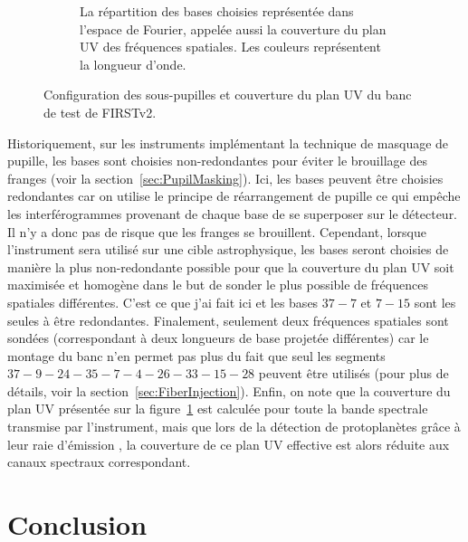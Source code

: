 \begin{figure}[ht!]
\begin{subfigure}{0.6\textwidth}
        \caption{La répartition des bases choisies représentée dans l'espace de Fourier, appelée aussi la couverture du plan UV des fréquences spatiales. Les couleurs représentent la longueur d'onde.}
        \label{fig:SegUVSimuleB}
    \end{subfigure}
    \caption[Configuration des sous-pupilles et couverture du plan UV du banc de test de FIRSTv2.]{Configuration des sous-pupilles et couverture du plan UV du banc de test de FIRSTv2.}
    \label{fig:SegUVSimule}
\end{figure}

Historiquement, sur les instruments implémentant la technique de masquage de pupille, les bases sont choisies non-redondantes pour éviter le brouillage des franges (voir la section~\ref{sec:PupilMasking}). Ici, les bases peuvent être choisies redondantes car on utilise le principe de réarrangement de pupille ce qui empêche les interférogrammes provenant de chaque base de se superposer sur le détecteur. Il n'y a donc pas de risque que les franges se brouillent. Cependant, lorsque l'instrument sera utilisé sur une cible astrophysique, les bases seront choisies de manière la plus non-redondante possible pour que la couverture du plan UV soit maximisée et homogène dans le but de sonder le plus possible de fréquences spatiales différentes. C'est ce que j'ai fait ici et les bases $37-7$ et $7-15$ sont les seules à être redondantes. Finalement, seulement deux fréquences spatiales sont sondées (correspondant à deux longueurs de base projetée différentes) car le montage du banc n'en permet pas plus du fait que seul les segments $37 - 9 - 24 - 35 - 7 - 4 - 26 - 33 - 15 - 28$ peuvent être utilisés (pour plus de détails, voir la section~\ref{sec:FiberInjection}). Enfin, on note que la couverture du plan UV présentée sur la figure~\ref{fig:SegUVSimuleB} est calculée pour toute la bande spectrale transmise par l'instrument, mais que lors de la détection de protoplanètes grâce à leur raie d'émission \ha, la couverture de ce plan UV effective est alors réduite aux canaux spectraux correspondant.


\section{Conclusion}

